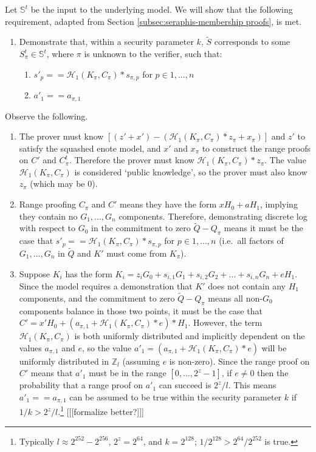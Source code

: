 \begin{appendices}
Let $\mathbb{S}^t$ be the input to the underlying model. We will show that the following requirement, adapted from Section \ref{subsec:seraphis-membership proofs}, is met.

\begin{enumerate}
    \item Demonstrate that, within a security parameter $k$, $\tilde{S}$ corresponds to some $S^t_{\pi} \in \mathbb{S}^t$, where $\pi$ is unknown to the verifier, such that:
    \begin{enumerate}
        \item $s'_p == \mathcal{H}_1(K_{\pi}, C_{\pi})*s_{\pi,p}$ for $p \in 1,...,n$
        \item $a'_1 == a_{\pi,1}$
    \end{enumerate}
\end{enumerate}

Observe the following.

\begin{enumerate}
    \item The prover must know $[(z' + x') - (\mathcal{H}_1(K_{\pi}, C_{\pi})*z_{\pi} + x_{\pi})]$ and $z'$ to satisfy the squashed enote model, and $x'$ and $x_{\pi}$ to construct the range proofs on $C'$ and $C^t_{\pi}$. Therefore the prover must know $\mathcal{H}_1(K_{\pi}, C_{\pi})*z_{\pi}$. The value $\mathcal{H}_1(K_{\pi}, C_{\pi})$ is considered `public knowledge', so the prover must also know $z_{\pi}$ (which may be 0).

    \item Range proofing $C_{\pi}$ and $C'$ means they have the form $x H_0 + a H_1$, implying they contain no $G_1,...,G_n$ components. Therefore, demonstrating discrete log with respect to $G_0$ in the commitment to zero $\tilde{Q} - Q_{\pi}$ means it must be the case that $s'_p == \mathcal{H}_1(K_{\pi}, C_{\pi})*s_{\pi,p}$ for $p \in 1,...,n$ (i.e.\ all factors of $G_1,...,G_n$ in $\tilde{Q}$ and $K'$ must come from $K_{\pi}$).

    \item Suppose $K_i$ has the form $K_i = z_i G_0 + s_{i,1} G_1 + s_{i,2} G_2 + ... + s_{i,n} G_n + e H_1$. Since the model requires a demonstration that $K'$ does not contain any $H_1$ components, and the commitment to zero $\tilde{Q} - Q_{\pi}$ means all non-$G_0$ components balance in those two points, it must be the case that $C' = x' H_0 + (a_{\pi,1} + \mathcal{H}_1(K_{\pi}, C_{\pi})*e)*H_1$. However, the term $\mathcal{H}_1(K_{\pi}, C_{\pi})$ is both uniformly distributed and implicitly dependent on the values $a_{\pi,1}$ and $e$, so the value $a'_1 = (a_{\pi,1} + \mathcal{H}_1(K_{\pi}, C_{\pi})*e)$ will be uniformly distributed in $\mathbb{Z}_l$ (assuming $e$ is non-zero). Since the range proof on $C'$ means that $a'_1$ must be in the range $[0,...,2^z - 1]$, if $e \neq 0$ then the probability that a range proof on $a'_1$ can succeed is $2^z/l$. This means $a'_1 == a_{\pi,1}$ can be assumed to be true within the security parameter $k$ if $1/k > 2^z/l$.\footnote{Typically $l \approx 2^{252} - 2^{256}$, $2^z = 2^{64}$, and $k = 2^{128}$; $1/2^{128} > 2^{64}/2^{252}$ is true.} [[[formalize better?]]]
\end{enumerate}


\end{appendices}
